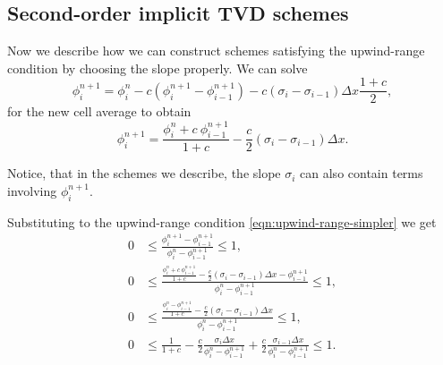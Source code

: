 \documentclass[../thesis.tex]{subfiles}
\begin{document}
\subsection[]{Second-order implicit TVD schemes}
Now we describe how we can construct schemes satisfying the upwind-range condition by choosing the slope properly.
We can solve
\begin{equation}
    \phi_{i}^{n+1}
    = \phi_{i}^{n} - c\left(
        \phi_{i}^{n+1}
        - \phi_{i-1}^{n+1}
        \right)
        -c\left(
        \sigma_{i} - \sigma_{i-1}
        \right)\Delta x\frac{1+c}{2},
\end{equation}
for the new cell average to obtain
\begin{equation}\label{eqn: second order implicit - solution}
    \phi_{i}^{n+1} =
    \frac{\phi_{i}^{n} +
    c~\phi_{i-1}^{n+1}}{1+c}
    -\frac{c}{2}\left(
        \sigma_{i} - \sigma_{i-1}
        \right)\Delta x.
\end{equation}
\begin{remark}
    Notice, that in the schemes we describe, the slope \(\sigma_{i}\) can also contain terms involving \(\phi_{i}^{n+1}\).
\end{remark}
Substituting to the upwind-range condition \eqref{eqn:upwind-range-simpler} we get
\begin{equation}
    \begin{split}\label{eqn: urc-all c-necessary}
        0
        &\leq
        \frac{\phi_{i}^{n+1} - \phi_{i-1}^{n+1}}
        {\phi_{i}^{n} - \phi_{i-1}^{n+1}}
        \leq
        1,
        \\
        0
        &\leq
        \frac{
        \frac{\phi_{i}^{n} +
        c~\phi_{i-1}^{n+1}}{1+c}
        -\frac{c}{2}\left(
            \sigma_{i} - \sigma_{i-1}
            \right)\Delta x - \phi_{i-1}^{n+1}}{\phi_{i}^{n} - \phi_{i-1}^{n+1}}
        \leq
        1,
        \\
        0
        &\leq
        \frac{
        \frac{\phi_{i}^{n} - \phi_{i-1}^{n+1}}{1+c}
        -\frac{c}{2}\left(
            \sigma_{i} - \sigma_{i-1}
            \right)\Delta x}{\phi_{i}^{n} - \phi_{i-1}^{n+1}}
        \leq
        1,
        \\
        0
        &\leq
        \frac{1}{1+c}
        -\frac{c}{2}
        \frac{\sigma_{i}\Delta x}
        {\phi_{i}^{n} - \phi_{i-1}^{n+1}}
        +\frac{c}{2}
        \frac{\sigma_{i-1}\Delta x}
        {\phi_{i}^{n} - \phi_{i-1}^{n+1}}
        \leq
        1.
    \end{split}
\end{equation}
\end{document}
